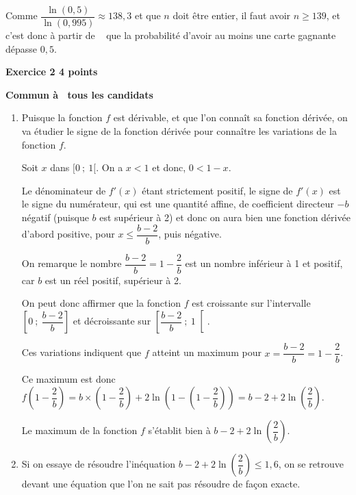 \documentclass[10pt]{article}
\newcommand{\euro}{\eurologo{}}
\begin{document}
\begin{enumerate}
Comme $\dfrac{\ln(0,5)}{\ln(0,995)} \approx 138,3$ et que $n$ doit être entier, il faut avoir $n\geqslant 139$, et c'est donc à partir de ~\euro{} que la probabilité d'avoir au moins une carte gagnante dépasse $0,5$.
	\end{enumerate}
	
\vspace{0,5cm}
	
	\textbf{Exercice 2 \hfill  4 points}
	
	\textbf{Commun à  tous les candidats}
	
\medskip

	\begin{enumerate}
		\item Puisque la fonction $f$ est dérivable, et que l'on connaît sa fonction dérivée, on va étudier le signe de la fonction dérivée pour connaître les variations de la fonction $f$.
		
\smallskip
		
Soit $x$ dans $[0~;~1[$. On a $x < 1$ et donc, $0< 1  -x$.
			
Le dénominateur de $f'(x)$ étant strictement positif, le signe de $f'(x)$ est le signe du numérateur, qui est une quantité affine, de coefficient directeur $- b$ négatif (puisque $b$ est supérieur à 2) et donc on aura bien une fonction dérivée d'abord positive, pour $x \leqslant \dfrac{b - 2}{b}$, puis négative.
		
On remarque le nombre $\dfrac{b-2}{b} = 1 - \dfrac{2}{b}$ est un nombre inférieur à 1 et positif, car $b$ est un réel positif, supérieur à 2.
		
On peut donc affirmer que la fonction $f$ est croissante sur l'intervalle $\left[0~;~\dfrac{b - 2}{b}\right] $ et décroissante sur $\left[\dfrac{b - 2}{b}~;~1\right[$. 
		
Ces variations indiquent que $f$ atteint un maximum pour $x = \dfrac{b - 2}{b} = 1 - \dfrac{2}{b}$.
		
Ce maximum est donc $f\left(1 - \dfrac{2}{b}\right) = b\times \left(1 - \dfrac{2}{b}\right) + 2\ln\left(1 - \left(1 - \dfrac{2}{b} \right) \right) = b - 2 + 2 \ln\left(\dfrac{2}{b}\right) $.
		
Le maximum de la fonction $f$ s'établit bien à $b - 2 + 2 \ln\left(\dfrac{2}{b}\right) $.
		
		\item Si on essaye de résoudre l'inéquation $b - 2 + 2 \ln\left(\dfrac{2}{b}\right) \leqslant 1,6$, on se retrouve devant une équation que l'on ne sait pas résoudre de façon exacte.
		

\end{enumerate}
\end{document}
